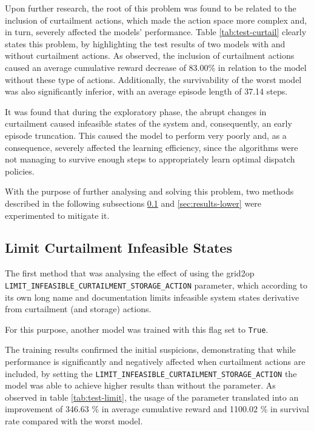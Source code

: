 Upon further research, the root of this problem was found to be related to the inclusion of curtailment actions, which made the action space more complex and, in turn, severely affected the models' performance. Table \ref{tab:test-curtail} clearly states this problem, by highlighting the test results of two models with and without curtailment actions. As observed, the inclusion of curtailment actions caused an average cumulative reward decrease of 83.00\% in relation to the model without these type of actions. Additionally, the survivability of the worst model was also significantly inferior, with an average episode length of 37.14 steps. \par
It was found that during the exploratory phase, the abrupt changes in curtailment caused infeasible states of the system and, consequently, an early episode truncation. This caused the model to perform very poorly and, as a consequence, severely affected the learning efficiency, since the algorithms were not managing to survive enough steps to appropriately learn optimal dispatch policies. \par
With the purpose of further analysing and solving this problem, two methods described in the following subsections \ref{sec:results-limit} and \ref{sec:results-lower} were experimented to mitigate it.


\subsection{Limit Curtailment Infeasible States} \label{sec:results-limit}

The first method that was analysing the effect of using the grid2op  \texttt{LIMIT\_INFEASIBLE\_CURTAILMENT\_STORAGE\_ACTION} parameter, which according to its own long name and documentation limits infeasible system states derivative from curtailment (and storage) actions. \par
For this purpose, another model was trained with this flag set to \texttt{True}. 

The training results confirmed the initial suspicions, demonstrating that while performance is significantly and negatively affected when curtailment actions are included, by setting the \texttt{LIMIT\_INFEASIBLE\_CURTAILMENT\_STORAGE\_ACTION} the model was able to achieve higher results than without the parameter. As observed in table \ref{tab:test-limit}, the usage of the parameter translated into an improvement of 346.63 \% in average cumulative reward and 1100.02 \% in survival rate compared with the worst model. \par

